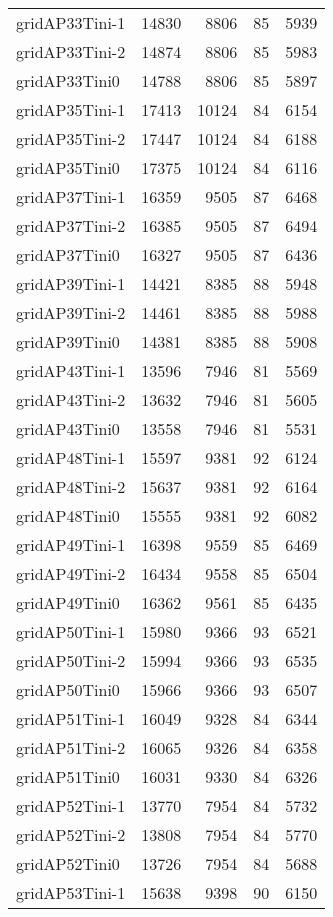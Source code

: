 \begin{longtable}{lrrrr}
gridAP33Tini-1 & 14830 & 8806 & 85 & 5939 \\
gridAP33Tini-2 & 14874 & 8806 & 85 & 5983 \\
gridAP33Tini0 & 14788 & 8806 & 85 & 5897 \\
gridAP35Tini-1 & 17413 & 10124 & 84 & 6154 \\
gridAP35Tini-2 & 17447 & 10124 & 84 & 6188 \\
gridAP35Tini0 & 17375 & 10124 & 84 & 6116 \\
gridAP37Tini-1 & 16359 & 9505 & 87 & 6468 \\
gridAP37Tini-2 & 16385 & 9505 & 87 & 6494 \\
gridAP37Tini0 & 16327 & 9505 & 87 & 6436 \\
gridAP39Tini-1 & 14421 & 8385 & 88 & 5948 \\
gridAP39Tini-2 & 14461 & 8385 & 88 & 5988 \\
gridAP39Tini0 & 14381 & 8385 & 88 & 5908 \\
gridAP43Tini-1 & 13596 & 7946 & 81 & 5569 \\
gridAP43Tini-2 & 13632 & 7946 & 81 & 5605 \\
gridAP43Tini0 & 13558 & 7946 & 81 & 5531 \\
gridAP48Tini-1 & 15597 & 9381 & 92 & 6124 \\
gridAP48Tini-2 & 15637 & 9381 & 92 & 6164 \\
gridAP48Tini0 & 15555 & 9381 & 92 & 6082 \\
gridAP49Tini-1 & 16398 & 9559 & 85 & 6469 \\
gridAP49Tini-2 & 16434 & 9558 & 85 & 6504 \\
gridAP49Tini0 & 16362 & 9561 & 85 & 6435 \\
gridAP50Tini-1 & 15980 & 9366 & 93 & 6521 \\
gridAP50Tini-2 & 15994 & 9366 & 93 & 6535 \\
gridAP50Tini0 & 15966 & 9366 & 93 & 6507 \\
gridAP51Tini-1 & 16049 & 9328 & 84 & 6344 \\
gridAP51Tini-2 & 16065 & 9326 & 84 & 6358 \\
gridAP51Tini0 & 16031 & 9330 & 84 & 6326 \\
gridAP52Tini-1 & 13770 & 7954 & 84 & 5732 \\
gridAP52Tini-2 & 13808 & 7954 & 84 & 5770 \\
gridAP52Tini0 & 13726 & 7954 & 84 & 5688 \\
gridAP53Tini-1 & 15638 & 9398 & 90 & 6150 \\

\end{longtable}
